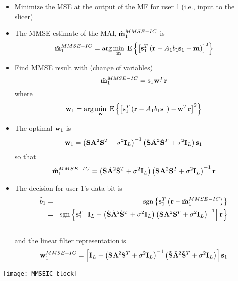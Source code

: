 \documentclass[25pt,landscape]{foils}
\newcommand{\br}{{\mathbf r}}
\newcommand{\bA}{{\mathbf A}}
\newcommand{\bbm}{{\bf m}}
\newcommand{\bs}{{\bf s}}
\newcommand{\bw}{{\bf w}}
\newcommand{\bS}{{\bf S}}
\newcommand{\bI}{{\bf I}}
\begin{document}
\begin{itemize}
\zerolistvertdimens
\item Minimize the MSE at the output of the MF for user 1 (i.e., input to
the slicer)
\item The MMSE estimate of the MAI, $\hat{\bbm}_{1}^{MMSE-IC}$ is \vspace{-.2in}
$$
\hat{\bbm}_{1}^{MMSE-IC} = \mbox{arg} \min_{\bbm} \; \mbox{E} \left\{ \left[
\bs_{1}^{T} \left( \br - A_{1}b_{1}\bs_{1} - \bbm \right) \right]^{2}
\right\}
$$
\item Find MMSE result with (change of variables) \vspace{-.2in}
$$
\hat{\bbm}_{1}^{MMSE-IC} = \bs_{1} \bw_{1}^{T} \br \vspace{-.30in}
$$
where  \vspace{-.7in}
$$
\bw_{1} = \mbox{arg} \min_{\bw} \; \mbox{E} \left\{ \left[ \bs_{1}^{T} \left(
\br - A_{1}b_{1}\bs_{1} \right) - \bw^{T} \br \right]^{2} \right\}
\vspace{-.1in}
$$
\item The optimal $\bw_{1}$ is \vspace{-.25in}
$$
\bw_{1} = \left( \bS \bA^{2} \bS^{T} + \sigma^{2} \bI_{L} \right)^{-1} \left(
\tilde{\bS} \tilde{\bA}^{2} \tilde{\bS}^{T} + \sigma^{2} \bI_{L} \right)
\bs_{1} \vspace{-.25in}
$$
so that \vspace{-.25in}
$$
\hat{\bbm}_{1}^{MMSE-IC} = \left( \tilde{\bS} \tilde{\bA}^{2}
\tilde{\bS}^{T} + \sigma^{2} \bI_{L} \right) \left( \bS \bA^{2} \bS^{T} +
\sigma^{2} \bI_{L} \right)^{-1} \br
$$
\end{itemize}

\begin{itemize}
\item The decision for user 1's data bit is \vspace{-.2in}
\begin{eqnarray*}
\hat{b}_{1} & = & \mbox{sgn} \left\{ \bs_{1}^{T} \left( \br -
\hat{\bbm}_{1}^{MMSE-IC} \right) \right\} \\
 & = & \mbox{sgn} \left\{ \bs_{1}^{T} \left[ \bI_{L} - \left( \tilde{\bS}
 \tilde{\bA}^{2} \tilde{\bS}^{T} + \sigma^{2} \bI_{L} \right) \left( \bS
 \bA^{2} \bS^{T} + \sigma^{2} \bI_{L} \right)^{-1} \right] \br \right\}
\end{eqnarray*} \vspace{-.4in} \\
and the linear filter representation is \vspace{-.2in}
$$
\bw_{1}^{MMSE-IC} = \left[ \bI_{L} - \left( \bS \bA^{2} \bS^{T} +
\sigma^{2} \bI_{L}\right)^{-1} \left( \tilde{\bS} \tilde{\bA}^{2}
\tilde{\bS}^{T} + \sigma^{2} \bI_{L} \right) \right] \bs_{1}
$$
\end{itemize}
\centerline{\texttt{[image: MMSEIC\_block]}}
\end{document}
